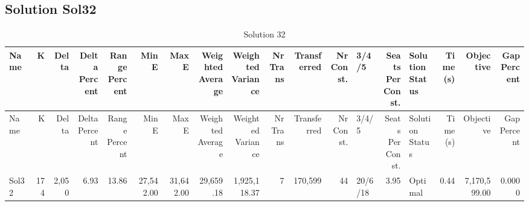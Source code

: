 \documentclass[a4paper]{article}
\begin{document}
\clearpage
\subsection{Solution Sol32}

{\scriptsize
\begin{longtable}{lrrrrrrrrrrrlrlrrr}
\caption{Solution 32}
\\ \toprule
Name &K &Delta &\shortstack{Delta\\Percent} &\shortstack{Range\\Percent} &Min E &Max E &\shortstack{Weighted\\Average} &\shortstack{Weighted\\Variance} &\shortstack{Nr\\Trans} &Transferred &\shortstack{Nr\\Const.} &3/4/5 &\shortstack{Seats\\Per\\Const.} &\shortstack{Solution\\Status} &\shortstack{Time\\(s)} &Objective &\shortstack{Gap\\Percent} \\ \midrule
\endfirsthead
\toprule
Name &K &Delta &\shortstack{Delta\\Percent} &\shortstack{Range\\Percent} &Min E &Max E &\shortstack{Weighted\\Average} &\shortstack{Weighted\\Variance} &\shortstack{Nr\\Trans} &Transferred &\shortstack{Nr\\Const.} &3/4/5 &\shortstack{Seats\\Per\\Const.} &\shortstack{Solution\\Status} &\shortstack{Time\\(s)} &Objective &\shortstack{Gap\\Percent} \\ \midrule
\endhead
\bottomrule
\endfoot
Sol32&174&2,050& 6.93&13.86&27,542.00&31,642.00&29,659.18&1,925,118.37&7&170,599&44&20/6/18& 3.95&Optimal& 0.44&7,170,599.00&0.0000\\ 
\end{longtable}

}
\end{document}
